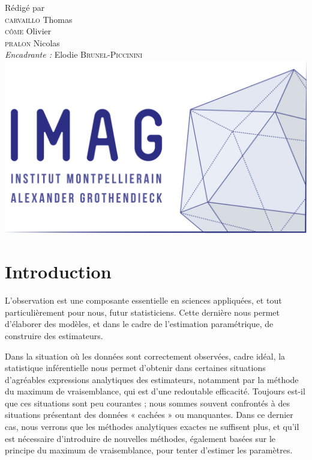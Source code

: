 \documentclass[frenchb]{report}
\newcommand{\1}{\mathbbm{1}}
\theoremstyle{definition}\newtheorem{defn}{Définition}
\theoremstyle{definition}\newtheorem{exm}{Exemple}
\theoremstyle{definition}\newtheorem{nota}{Notation}
\theoremstyle{definition}\newtheorem{rem}{Remarque}
\begin{document}
\begin{titlepage}
\begin{center}
{\large Rédigé par\\}
{\Large \textsc{carvaillo} Thomas}\\
{\Large \textsc{côme} Olivier}\\
{\Large \textsc{pralon} Nicolas}\\[1cm]
{\large \emph{Encadrante :} Elodie \textsc{Brunel-Piccinini}}\\[1.5cm] 

\includegraphics[scale=0.7]{imag_logo.png}

\end{center}
\end{titlepage}
\tableofcontents
\newpage

\chapter*{Introduction}

L'observation est une composante essentielle en sciences appliquées, et tout particulièrement pour nous, futur statisticiens. Cette dernière nous permet d’élaborer des modèles, et dans le cadre de l’estimation paramétrique, de construire des estimateurs.

Dans la situation où les données sont correctement observées, cadre idéal, la statistique inférentielle nous permet d’obtenir dans certaines situations d’agréables expressions analytiques des estimateurs, notamment par la méthode du maximum de vraisemblance, qui est d'une redoutable efficacité. Toujours est-il que ces situations sont peu courantes ; nous sommes souvent confrontés à des situations présentant des données « cachées » ou manquantes. Dans ce dernier cas, nous verrons que les méthodes analytiques exactes ne suffisent plus, et qu’il est nécessaire d’introduire de nouvelles méthodes, également basées sur le principe du maximum de vraisemblance, pour tenter d’estimer les paramètres.
\end{document}
